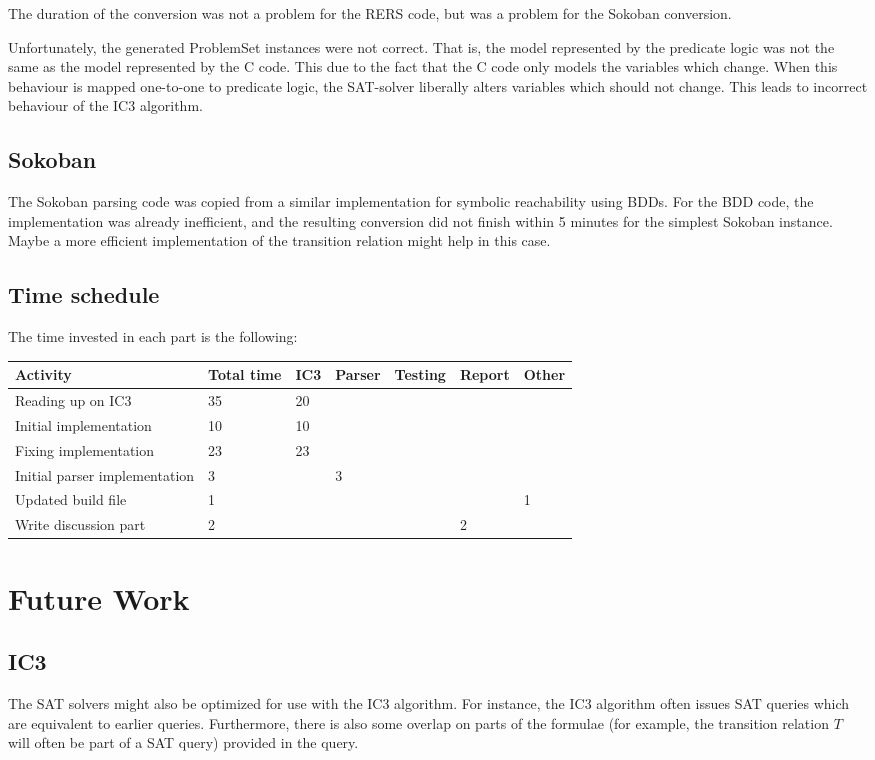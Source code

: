 \documentclass[a4paper]{article}
\begin{document}
The duration of the conversion was not a problem for the RERS code, but was a problem for the Sokoban conversion.

Unfortunately, the generated ProblemSet instances were not correct.
That is, the model represented by the predicate logic was not the same as the model represented by the C code. This due to the fact that the C code only models the variables which change. When this behaviour is mapped one-to-one to predicate logic, the SAT-solver liberally alters variables which should not change. This leads to incorrect behaviour of the IC3 algorithm.

\subsection{Sokoban}
The Sokoban parsing code was copied from a similar implementation for symbolic reachability using BDDs. For the BDD code, the implementation was already inefficient, and the resulting conversion did not finish within 5 minutes for the simplest Sokoban instance. Maybe a more efficient implementation of the transition relation might help in this case.

\subsection{Time schedule}
The time invested in each part is the following:

\begin{tabularx}{\linewidth}{X|l|l|l|l|l|l}
	Activity & Total time& IC3 & Parser & Testing & Report & Other\\\hline
	Reading up on IC3 & 	35 & 20 		&&&&\\\hline
	Initial implementation & 10 & 10		&&&&\\\hline
	Fixing implementation & 23 & 23		&&&&\\\hline
	Initial parser implementation & 3 && 3 \\\hline
	Updated build file & 	1 &&&&&	1	\\\hline
	Write discussion part &	2 &&&&	2	&\\\hline
\end{tabularx}

\section{Future Work}
\subsection{IC3}
The SAT solvers might also be optimized for use with the IC3 algorithm. For instance, the IC3 algorithm often issues SAT queries which are equivalent to earlier queries. Furthermore, there is also some overlap on parts of the formulae (for example, the transition relation $T$ will often be part of a SAT query) provided in the query.
\end{document}
